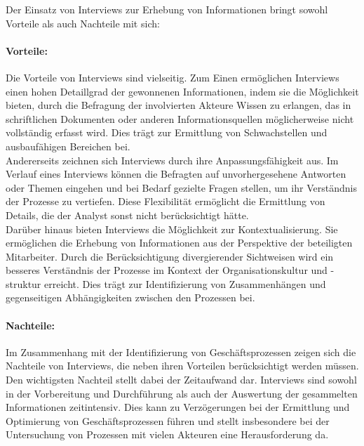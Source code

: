 Der Einsatz von Interviews zur Erhebung von Informationen bringt sowohl Vorteile als auch Nachteile mit sich:~\cite[Kapitel 5.2.2, 5.2.4]{Dumas2013}

\paragraph{Vorteile:}
Die Vorteile von Interviews sind vielseitig. Zum Einen ermöglichen Interviews einen hohen Detaillgrad der gewonnenen Informationen, indem sie die Möglichkeit bieten, durch die Befragung der involvierten Akteure Wissen zu erlangen, das in schriftlichen Dokumenten oder anderen Informationsquellen möglicherweise nicht vollständig erfasst wird. Dies trägt zur Ermittlung von Schwachstellen und ausbaufähigen Bereichen bei.\\

Andererseits zeichnen sich Interviews durch ihre Anpassungsfähigkeit aus. Im Verlauf eines Interviews können die Befragten auf unvorhergesehene Antworten oder Themen eingehen und bei Bedarf gezielte Fragen stellen, um ihr Verständnis der Prozesse zu vertiefen. Diese Flexibilität ermöglicht die Ermittlung von Details, die der Analyst sonst nicht berücksichtigt hätte.\\

Darüber hinaus bieten Interviews die Möglichkeit zur Kontextualisierung. Sie ermöglichen die Erhebung von Informationen aus der Perspektive der beteiligten Mitarbeiter. Durch die Berücksichtigung divergierender Sichtweisen wird ein besseres Verständnis der Prozesse im Kontext der Organisationskultur und -struktur erreicht. Dies trägt zur Identifizierung von Zusammenhängen und gegenseitigen Abhängigkeiten zwischen den Prozessen bei.\\

\paragraph{Nachteile:}
Im Zusammenhang mit der Identifizierung von Geschäftsprozessen zeigen sich die Nachteile von Interviews, die neben ihren Vorteilen berücksichtigt werden müssen.\\

Den wichtigsten Nachteil stellt dabei der Zeitaufwand dar. Interviews sind sowohl in der Vorbereitung und Durchführung als auch der Auswertung der gesammelten Informationen zeitintensiv. Dies kann zu Verzögerungen bei der Ermittlung und Optimierung von Geschäftsprozessen führen und stellt insbesondere bei der Untersuchung von Prozessen mit vielen Akteuren eine Herausforderung da.\\

